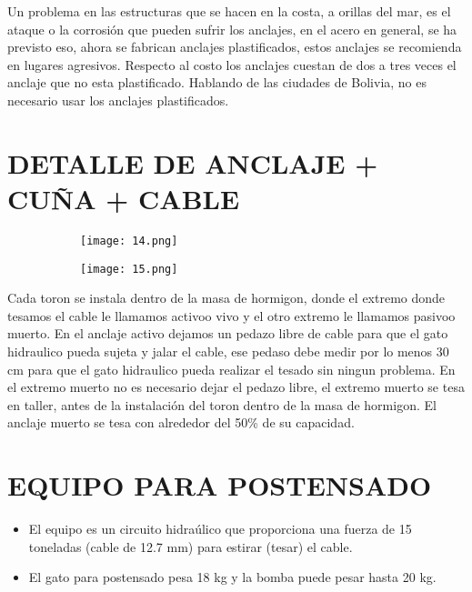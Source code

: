 Un problema en las estructuras que se hacen en la costa, a orillas del mar,
es el ataque o la corrosión que pueden sufrir los anclajes, en el acero en
general, se ha previsto eso, ahora se fabrican anclajes plastificados, estos
anclajes se recomienda en lugares agresivos. Respecto al costo los anclajes
cuestan de dos a tres veces el anclaje que no esta plastificado. Hablando de
las ciudades de Bolivia, no es necesario usar los anclajes plastificados.

\section{DETALLE DE ANCLAJE + CUÑA + CABLE}

\begin{figure}[H]
	\begin{subfigure}{0.5\textwidth}
	\centering
	\texttt{[image: 14.png]}
	\end{subfigure}
	\begin{subfigure}{0.5\textwidth}
	\centering
	\texttt{[image: 15.png]}
	\end{subfigure}
\end{figure}

Cada toron se instala dentro de la masa de hormigon, donde el extremo donde
tesamos el cable le llamamos \textquotedbl activo\textquotedbl o \textquotedbl vivo\textquotedbl
y el otro extremo le llamamos \textquotedbl pasivo\textquotedbl o \textquotedbl muerto\textquotedbl .
En el anclaje activo dejamos un pedazo libre de cable para que el gato hidraulico pueda sujeta y jalar
el cable, ese pedaso debe medir por lo menos 30 cm para que el gato hidraulico pueda realizar el tesado
sin ningun problema. En el extremo muerto no es necesario dejar el pedazo libre,
el extremo muerto se tesa en taller, antes de la instalación del toron dentro de la masa
de hormigon. El anclaje muerto se tesa con alrededor del 50\% de su capacidad.

\section{EQUIPO PARA POSTENSADO}

\begin{itemize}
	\item {El equipo es un circuito hidraúlico que proporciona una fuerza de
	       15 toneladas (cable de 12.7 mm) para estirar (tesar) el cable.}
	\item {El gato para postensado pesa 18 kg y la bomba puede pesar hasta
			20 kg.}
\end{itemize}

